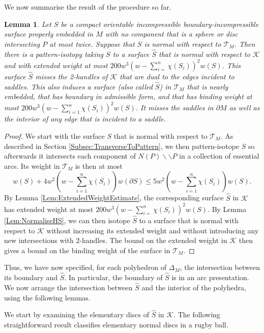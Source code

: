 \documentclass[oneside]{amsart}
\numberwithin{equation}{section}
\theoremstyle{plain}
\newtheorem{lemma}[equation]{Lemma}
\theoremstyle{definition}
\newcommand{\calT}{{\mathcal{T}}}
\newcommand{\cut}{\backslash\backslash}
\begin{document}
We now summarise the result of the procedure so far.

\begin{lemma}
Let $S$ be a compact orientable incompressible boundary-incompressible surface properly embedded in $M$ with no component that is a
sphere or disc intersecting $P$ at most twice. Suppose that $S$ is normal with respect to $\calT_M$.
Then there is a pattern-isotopy taking $S$ to a surface $\hat S$ that is normal with respect to $\mathcal{K}$
and with extended weight at most 
$200w^3 (w - \sum_{i=}^n \chi(S_i))^2 w(S)$.
This surface $\hat S$ misses the 2-handles of $\mathcal{K}$ that are dual to the edges 
incident to saddles. 
This also induces a surface (also called $\hat S$) in $\calT_M$ that is nearly embedded, that has boundary in admissible form,
and that has binding weight at most 
$200w^3 (w - \sum_{i=1}^n \chi(S_i))^2 w(S)$.
It misses the saddles in $\partial M$ as well as the interior of any edge that is incident
to a saddle. 
\end{lemma}

\begin{proof}
We start with the surface $S$ that is normal with respect to $\calT_M$. As described in Section \ref{Subsec:TransverseToPattern},
we then pattern-isotope $S$ so afterwards it
intersects each component of $N(P) \cut P$ in a collection of essential arcs. Its weight in $\calT_M$ is then
at most 
$$w(S) + 4w^2(w - \sum_{i=1}^n \chi(S_i)) w(\partial S)  \leq 5w^2(w - \sum_{i=1}^n \chi(S_i)) w(S).$$
By Lemma \ref{Lem:ExtendedWeightEstimate}, the corresponding surface $\hat S$ in $\mathcal{K}$ has extended weight
at most $200w^3 (w - \sum_{i=}^n \chi(S_i))^2 w(S)$. By Lemma \ref{Lem:NormaliseHS}, we can then isotope $\hat S$ to a surface that
is normal with respect to $\mathcal{K}$ without increasing its extended weight and without introducing any
new intersections with 2-handles. The bound on the extended weight in $\mathcal{K}$ then gives a bound
on the binding weight of the surface in $\calT_M$.
\end{proof}


Thus, we have now specified, for each polyhedron of $\Delta_M$, the intersection between its
boundary and $\hat S$. In particular, the boundary of $\hat S$ is in an arc presentation.
We now arrange the intersection between $\hat S$ and the interior
of the polyhedra, using the following lemmas.


We start by examining the elementary discs of $\hat S$ in $\mathcal{K}$. The following straightforward
result classifies elementary normal discs in a rugby ball.
\end{document}
